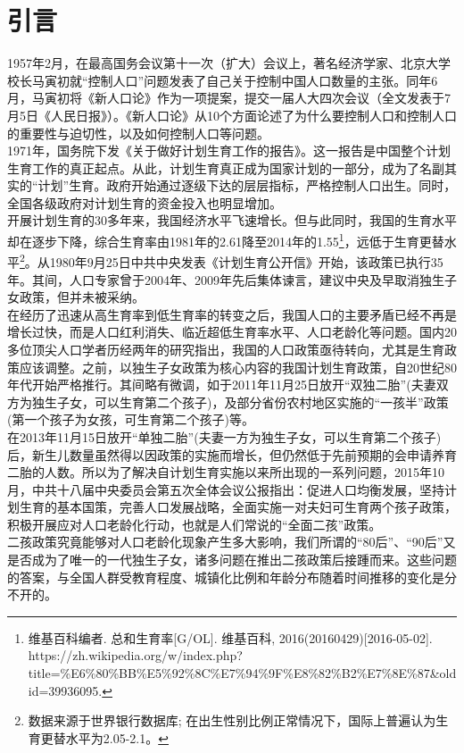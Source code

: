 \documentclass[a4paper]{article}
\begin{document}
\part{引言}
1957年2月，在最高国务会议第十一次（扩大）会议上，著名经济学家、北京大学校长马寅初就“控制人口”问题发表了自己关于控制中国人口数量的主张。同年6月，马寅初将《新人口论》作为一项提案，提交一届人大四次会议（全文发表于7月5日《人民日报》）。《新人口论》从10个方面论述了为什么要控制人口和控制人口的重要性与迫切性，以及如何控制人口等问题。\\
\indent
1971年，国务院下发《关于做好计划生育工作的报告》。这一报告是中国整个计划生育工作的真正起点。从此，计划生育真正成为国家计划的一部分，成为了名副其实的“计划”生育。政府开始通过逐级下达的层层指标，严格控制人口出生。同时，全国各级政府对计划生育的资金投入也明显增加。\\
\indent
开展计划生育的30多年来，我国经济水平飞速增长。但与此同时，我国的生育水平却在逐步下降，综合生育率由1981年的2.61降至2014年的1.55\footnote{维基百科编者. 总和生育率[G/OL]. 维基百科, 2016(20160429)[2016-05-02]. https://zh.wikipedia.org/w/index.php?title=\%E6\%80\%BB\%E5\%92\%8C\%E7\%94\%9F\%E8\%82\%B2\%E7\%8E\%87\&oldid=39936095.}，远低于生育更替水平\footnote{数据来源于世界银行数据库; 在出生性别比例正常情况下，国际上普遍认为生育更替水平为2.05-2.1。}。从1980年9月25日中共中央发表《计划生育公开信》开始，该政策已执行35年。其间，人口专家曾于2004年、2009年先后集体谏言，建议中央及早取消独生子女政策，但并未被采纳。\\
\indent
在经历了迅速从高生育率到低生育率的转变之后，我国人口的主要矛盾已经不再是增长过快，而是人口红利消失、临近超低生育率水平、人口老龄化等问题。国内20多位顶尖人口学者历经两年的研究指出，我国的人口政策亟待转向，尤其是生育政策应该调整。之前，以独生子女政策为核心内容的我国计划生育政策，自20世纪80年代开始严格推行。其间略有微调，如于2011年11月25日放开“双独二胎”(夫妻双方为独生子女，可以生育第二个孩子)，及部分省份农村地区实施的“一孩半”政策(第一个孩子为女孩，可生育第二个孩子)等。\\
\indent
在2013年11月15日放开“单独二胎”(夫妻一方为独生子女，可以生育第二个孩子)后，新生儿数量虽然得以因政策的实施而增长，但仍然低于先前预期的会申请养育二胎的人数。所以为了解决自计划生育实施以来所出现的一系列问题，2015年10月，中共十八届中央委员会第五次全体会议公报指出：促进人口均衡发展，坚持计划生育的基本国策，完善人口发展战略，全面实施一对夫妇可生育两个孩子政策，积极开展应对人口老龄化行动，也就是人们常说的“全面二孩”政策。\\
\indent
二孩政策究竟能够对人口老龄化现象产生多大影响，我们所谓的“80后”、“90后”又是否成为了唯一的一代独生子女，诸多问题在推出二孩政策后接踵而来。这些问题的答案，与全国人群受教育程度、城镇化比例和年龄分布随着时间推移的变化是分不开的。
\end{document}
